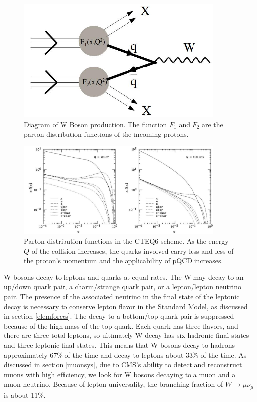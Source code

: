 \documentclass[oneside, letterpaper, oldfontcommands]{memoir}
\begin{document}
\begin{figure}[here]
\includegraphics[width=0.9\textwidth]{WFormation.jpg}
\caption{Diagram of W Boson production. The function $F_{1}$ and $F_{2}$ are the parton distribution functions of the incoming protons.}
\label{fig:WFormation}
\end{figure}

\begin{figure}[here]
\includegraphics[width=0.9\textwidth]{cteq6PDF.jpg}
\caption{Parton distribution functions in the CTEQ6 scheme\cite{Pumplin:2002vw}. As the energy $Q$ of the collision increases, the quarks involved carry less and less of the proton's momentum and the applicability of pQCD increases.}
\label{fig:cteq6PDF}
\end{figure}

\qquad W bosons decay to leptons and quarks at equal rates. The W may decay to an up/down quark pair, a charm/strange quark pair, or a lepton/lepton neutrino pair. The presence of the associated neutrino in the final state of the leptonic decay is necessary to conserve lepton flavor in the Standard Model, as discussed in section \ref{elemforces}.  The decay to a bottom/top quark pair is suppressed because of the high mass of the top quark. Each quark has three flavors, and there are three total leptons, so ultimately W decay has six hadronic final states and three leptonic final states. This means that W bosons decay to hadrons approximately 67$\%$ of the time and decay to leptons about $33\%$ of the time. As discussed in section \ref{muonsys}, due to CMS's ability to detect and reconstruct muons with high efficiency, we look for W bosons decaying to a muon and a muon neutrino. Because of lepton universality, the branching fraction of $W \rightarrow \mu\nu_{\mu}$ is about 11$\%$. 
\end{document}
